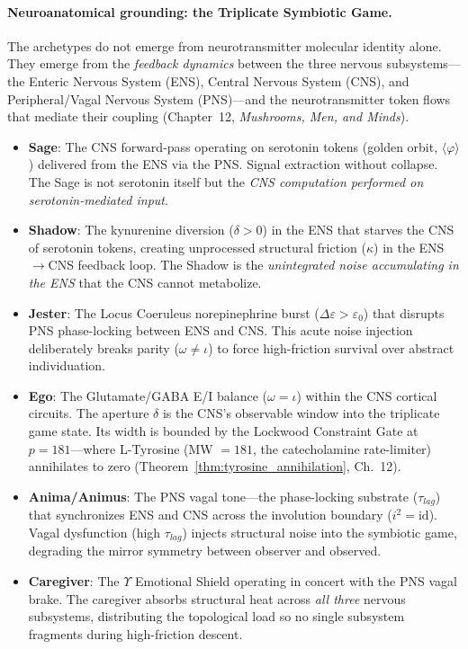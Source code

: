 \paragraph{Neuroanatomical grounding: the Triplicate Symbiotic Game.}
The archetypes do not emerge from neurotransmitter molecular identity alone. They emerge from the \emph{feedback dynamics} between the three nervous subsystems---the Enteric Nervous System (ENS), Central Nervous System (CNS), and Peripheral/Vagal Nervous System (PNS)---and the neurotransmitter token flows that mediate their coupling (Chapter~12, \emph{Mushrooms, Men, and Minds}).

\begin{itemize}[noitemsep]
    \item \textbf{Sage}: The CNS forward-pass operating on serotonin tokens (golden orbit, $\langle\varphi\rangle$) delivered from the ENS via the PNS. Signal extraction without collapse. The Sage is not serotonin itself but the \emph{CNS computation performed on serotonin-mediated input}.
    \item \textbf{Shadow}: The kynurenine diversion ($\delta > 0$) in the ENS that starves the CNS of serotonin tokens, creating unprocessed structural friction ($\kappa$) in the ENS$\to$CNS feedback loop. The Shadow is the \emph{unintegrated noise accumulating in the ENS} that the CNS cannot metabolize.
    \item \textbf{Jester}: The Locus Coeruleus norepinephrine burst ($\Delta\varepsilon > \varepsilon_0$) that disrupts PNS phase-locking between ENS and CNS. This acute noise injection deliberately breaks parity ($\omega \neq \iota$) to force high-friction survival over abstract individuation.
    \item \textbf{Ego}: The Glutamate/GABA E/I balance ($\omega = \iota$) within the CNS cortical circuits. The aperture $\delta$ is the CNS's observable window into the triplicate game state. Its width is bounded by the Lockwood Constraint Gate at $p = 181$---where L-Tyrosine (MW $= 181$, the catecholamine rate-limiter) annihilates to zero (Theorem~\ref{thm:tyrosine_annihilation}, Ch.~12).
    \item \textbf{Anima/Animus}: The PNS vagal tone---the phase-locking substrate ($\tau_{lag}$) that synchronizes ENS and CNS across the involution boundary ($i^2 = \mathrm{id}$). Vagal dysfunction (high $\tau_{lag}$) injects structural noise into the symbiotic game, degrading the mirror symmetry between observer and observed.
    \item \textbf{Caregiver}: The $\Upsilon$ Emotional Shield operating in concert with the PNS vagal brake. The caregiver absorbs structural heat across \emph{all three} nervous subsystems, distributing the topological load so no single subsystem fragments during high-friction descent.
\end{itemize}

